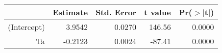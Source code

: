\begin{tabular}{rrrrr}
  \hline
 & Estimate & Std. Error & t value & Pr($>$$|$t$|$) \\ 
  \hline
(Intercept) & 3.9542 & 0.0270 & 146.56 & 0.0000 \\ 
  Ta & -0.2123 & 0.0024 & -87.41 & 0.0000 \\ 
   \hline
\end{tabular}

